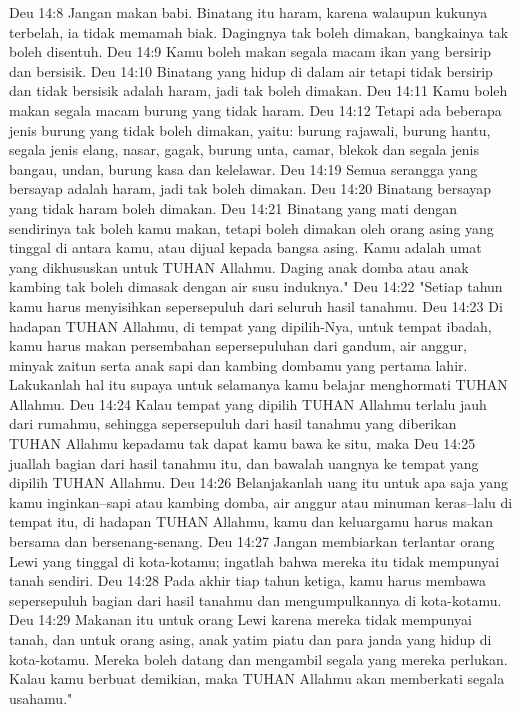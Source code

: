 Deu 14:8  Jangan makan babi. Binatang itu haram, karena walaupun kukunya terbelah, ia tidak memamah biak. Dagingnya tak boleh dimakan, bangkainya tak boleh disentuh.
Deu 14:9  Kamu boleh makan segala macam ikan yang bersirip dan bersisik.
Deu 14:10  Binatang yang hidup di dalam air tetapi tidak bersirip dan tidak bersisik adalah haram, jadi tak boleh dimakan.
Deu 14:11  Kamu boleh makan segala macam burung yang tidak haram.
Deu 14:12  Tetapi ada beberapa jenis burung yang tidak boleh dimakan, yaitu: burung rajawali, burung hantu, segala jenis elang, nasar, gagak, burung unta, camar, blekok dan segala jenis bangau, undan, burung kasa dan kelelawar.
Deu 14:19  Semua serangga yang bersayap adalah haram, jadi tak boleh dimakan.
Deu 14:20  Binatang bersayap yang tidak haram boleh dimakan.
Deu 14:21  Binatang yang mati dengan sendirinya tak boleh kamu makan, tetapi boleh dimakan oleh orang asing yang tinggal di antara kamu, atau dijual kepada bangsa asing. Kamu adalah umat yang dikhususkan untuk TUHAN Allahmu. Daging anak domba atau anak kambing tak boleh dimasak dengan air susu induknya."
Deu 14:22  "Setiap tahun kamu harus menyisihkan sepersepuluh dari seluruh hasil tanahmu.
Deu 14:23  Di hadapan TUHAN Allahmu, di tempat yang dipilih-Nya, untuk tempat ibadah, kamu harus makan persembahan sepersepuluhan dari gandum, air anggur, minyak zaitun serta anak sapi dan kambing dombamu yang pertama lahir. Lakukanlah hal itu supaya untuk selamanya kamu belajar menghormati TUHAN Allahmu.
Deu 14:24  Kalau tempat yang dipilih TUHAN Allahmu terlalu jauh dari rumahmu, sehingga sepersepuluh dari hasil tanahmu yang diberikan TUHAN Allahmu kepadamu tak dapat kamu bawa ke situ, maka
Deu 14:25  juallah bagian dari hasil tanahmu itu, dan bawalah uangnya ke tempat yang dipilih TUHAN Allahmu.
Deu 14:26  Belanjakanlah uang itu untuk apa saja yang kamu inginkan--sapi atau kambing domba, air anggur atau minuman keras--lalu di tempat itu, di hadapan TUHAN Allahmu, kamu dan keluargamu harus makan bersama dan bersenang-senang.
Deu 14:27  Jangan membiarkan terlantar orang Lewi yang tinggal di kota-kotamu; ingatlah bahwa mereka itu tidak mempunyai tanah sendiri.
Deu 14:28  Pada akhir tiap tahun ketiga, kamu harus membawa sepersepuluh bagian dari hasil tanahmu dan mengumpulkannya di kota-kotamu.
Deu 14:29  Makanan itu untuk orang Lewi karena mereka tidak mempunyai tanah, dan untuk orang asing, anak yatim piatu dan para janda yang hidup di kota-kotamu. Mereka boleh datang dan mengambil segala yang mereka perlukan. Kalau kamu berbuat demikian, maka TUHAN Allahmu akan memberkati segala usahamu."
